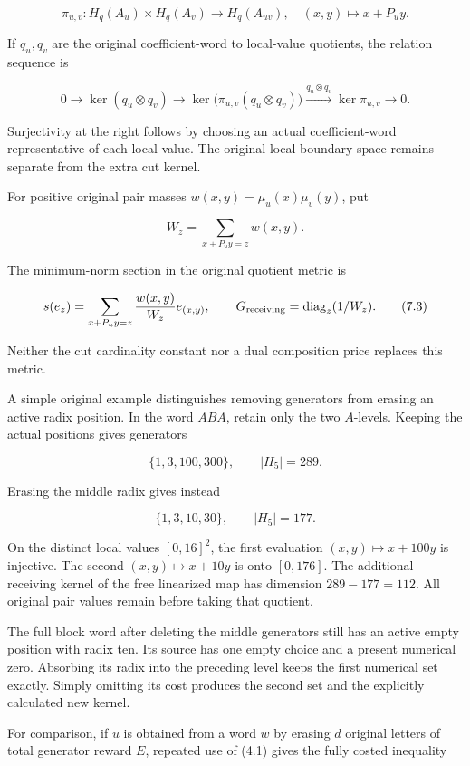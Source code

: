 \[
\pi_{u,v}:H_q(A_u)\times H_q(A_v)\to H_q(A_{uv}),
\quad(x,y)\mapsto x+P_uy.
\tag{7.1}
\]

If \(q_u,q_v\) are the original coefficient-word to local-value quotients, the relation sequence is

\[
0\to\ker(q_u\otimes q_v)
\to\ker\bigl(\pi_{u,v}(q_u\otimes q_v)\bigr)
\xrightarrow{q_u\otimes q_v}\ker\pi_{u,v}\to0.
\tag{7.2}
\]

Surjectivity at the right follows by choosing an actual coefficient-word representative of each local value. The original local boundary space remains separate from the extra cut kernel.

For positive original pair masses \(w(x,y)=\mu_u(x)\mu_v(y)\), put

\[
W_z=\sum_{x+P_uy=z}w(x,y).
\]

The minimum-norm section in the original quotient metric is

\[
s(e_z)=\sum_{x+P_uy=z}\frac{w(x,y)}{W_z}e_{(x,y)},
\qquad G_{\rm receiving}=\operatorname{diag}_z(1/W_z).
\tag{7.3}
\]

Neither the cut cardinality constant nor a dual composition price replaces this metric.

A simple original example distinguishes removing generators from erasing an active radix position. In the word \(ABA\), retain only the two \(A\)-levels. Keeping the actual positions gives generators

\[
\{1,3,100,300\},\qquad |H_5|=289.
\]

Erasing the middle radix gives instead

\[
\{1,3,10,30\},\qquad |H_5|=177.
\]

On the distinct local values \([0,16]^2\), the first evaluation \((x,y)\mapsto x+100y\) is injective. The second \((x,y)\mapsto x+10y\) is onto \([0,176]\). The additional receiving kernel of the free linearized map has dimension \(289-177=112\). All original pair values remain before taking that quotient.

The full block word after deleting the middle generators still has an active empty position with radix ten. Its source has one empty choice and a present numerical zero. Absorbing its radix into the preceding level keeps the first numerical set exactly. Simply omitting its cost produces the second set and the explicitly calculated new kernel.

For comparison, if \(u\) is obtained from a word \(w\) by erasing \(d\) original letters of total generator reward \(E\), repeated use of (4.1) gives the fully costed inequality

